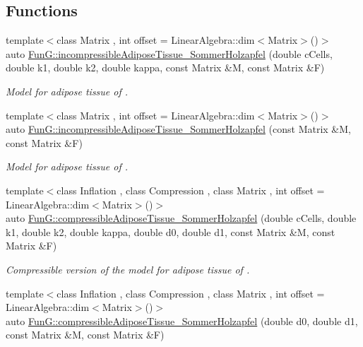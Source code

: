 \subsection*{Functions}
\begin{DoxyCompactItemize}
\item 
{\footnotesize template$<$class Matrix , int offset = Linear\-Algebra\-::dim$<$\-Matrix$>$()$>$ }\\auto \hyperlink{group__Biomechanics_gac269eefc1abb994044e1634c20a98061}{Fun\-G\-::incompressible\-Adipose\-Tissue\-\_\-\-Sommer\-Holzapfel} (double c\-Cells, double k1, double k2, double kappa, const Matrix \&M, const Matrix \&F)
\begin{DoxyCompactList}\small\item\em Model for adipose tissue of \cite{Sommer2013}. \end{DoxyCompactList}\item 
{\footnotesize template$<$class Matrix , int offset = Linear\-Algebra\-::dim$<$\-Matrix$>$()$>$ }\\auto \hyperlink{group__Biomechanics_ga01ab128bcf179f4431b0270179af9e20}{Fun\-G\-::incompressible\-Adipose\-Tissue\-\_\-\-Sommer\-Holzapfel} (const Matrix \&M, const Matrix \&F)
\begin{DoxyCompactList}\small\item\em Model for adipose tissue of \cite{Sommer2013}. \end{DoxyCompactList}\item 
{\footnotesize template$<$class Inflation , class Compression , class Matrix , int offset = Linear\-Algebra\-::dim$<$\-Matrix$>$()$>$ }\\auto \hyperlink{group__Biomechanics_ga5c3388564c0420b62e58f48c739d27f1}{Fun\-G\-::compressible\-Adipose\-Tissue\-\_\-\-Sommer\-Holzapfel} (double c\-Cells, double k1, double k2, double kappa, double d0, double d1, const Matrix \&M, const Matrix \&F)
\begin{DoxyCompactList}\small\item\em Compressible version of the model for adipose tissue of \cite{Sommer2013}. \end{DoxyCompactList}\item 
{\footnotesize template$<$class Inflation , class Compression , class Matrix , int offset = Linear\-Algebra\-::dim$<$\-Matrix$>$()$>$ }\\auto \hyperlink{group__Biomechanics_ga27bb3f7c579ce8c21a69ea4d4d0169d7}{Fun\-G\-::compressible\-Adipose\-Tissue\-\_\-\-Sommer\-Holzapfel} (double d0, double d1, const Matrix \&M, const Matrix \&F)

\end{DoxyCompactItemize}
